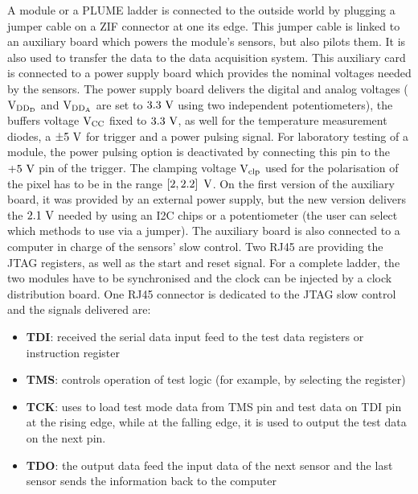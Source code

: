   A module or a PLUME ladder is connected to the outside world by plugging a jumper cable on a \gls{ZIF} connector at one its edge.
  This jumper cable is linked to an auxiliary board which powers the module's sensors, but also pilots them.
  It is also used to transfer the data to the data acquisition system.
  This auxiliary card is connected to a power supply board which provides the nominal voltages needed by the sensors.
  The power supply board delivers the digital and analog voltages ($\rm{V}_{\rm{DD_D}}$ and $\rm{V}_{\rm{DD_A}}$ are set to $3.3~\rm{V}$ using two independent potentiometers), the buffers voltage $\rm{V}_{\rm{CC}}$ fixed to $3.3~\rm{V}$, as well for the temperature measurement diodes, a $\pm 5~\rm{V}$ for trigger and a power pulsing signal.
  For laboratory testing of a module, the power pulsing option is deactivated by connecting this pin to the $+5~\rm{V}$ pin of the trigger.
  The clamping voltage $\rm{V}_{\rm{clp}}$ used for the polarisation of the pixel has to be in the range $\left[2, 2.2\right]~\rm{V}$.
  On the first version of the auxiliary board, it was provided by an external power supply, but the new version delivers the $2.1~\rm{V}$ needed by using an \gls{I2C} chips or a potentiometer (the user can select which methods to use via a jumper).
  The auxiliary board is also connected to a computer in charge of the sensors' slow control.
  Two RJ45 are providing the \gls{JTAG} registers, as well as the start and reset signal. 
  For a complete ladder, the two modules have to be synchronised and the clock can be injected by a clock distribution board.
  One RJ45 connector is dedicated to the \gls{JTAG} slow control and the signals delivered are: 

  \begin{itemize}
    \item \textbf{\gls{TDI}}: received the serial data input feed to the test data registers or instruction register
    \item \textbf{\gls{TMS}}: controls operation of test logic (for example, by selecting the register)
    \item \textbf{\gls{TCK}}: uses to load test mode data from \gls{TMS} pin and test data on \gls{TDI} pin at the rising edge, while at the falling edge, it is used to output the test data on the next pin.
    \item \textbf{\gls{TDO}}: the output data feed the input data of the next sensor and the last sensor sends the information back to the computer 
  \end{itemize}

